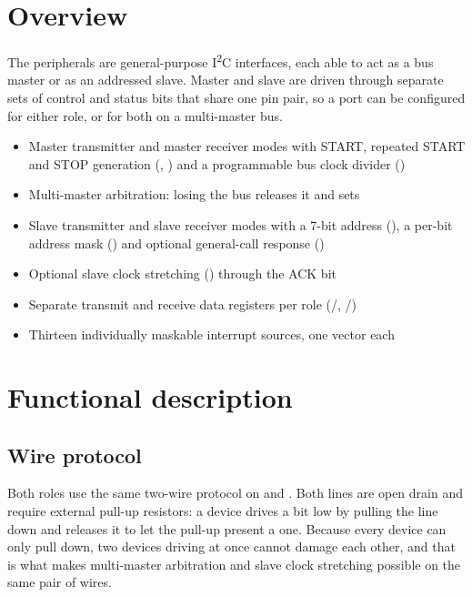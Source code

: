 \section{Overview}

The  peripherals are general-purpose I\textsuperscript{2}C interfaces, each able to act as a bus master or as an addressed slave. Master and slave are driven through separate sets of control and status bits that share one pin pair, so a port can be configured for either role, or for both on a multi-master bus.

\begin{itemize}
	\item Master transmitter and master receiver modes with START, repeated START and STOP generation (, ) and a programmable bus clock divider ()
	\item Multi-master arbitration: losing the bus releases it and sets 
	\item Slave transmitter and slave receiver modes with a 7-bit address (), a per-bit address mask () and optional general-call response ()
	\item Optional slave clock stretching () through the ACK bit
	\item Separate transmit and receive data registers per role (/, /)
	\item Thirteen individually maskable interrupt sources, one vector each
\end{itemize}

\section{Functional description}

\subsection{Wire protocol}

Both roles use the same two-wire protocol on  and . Both lines are open drain and require external pull-up resistors: a device drives a bit low by pulling the line down and releases it to let the pull-up present a one. Because every device can only pull down, two devices driving at once cannot damage each other, and that is what makes multi-master arbitration and slave clock stretching possible on the same pair of wires.

